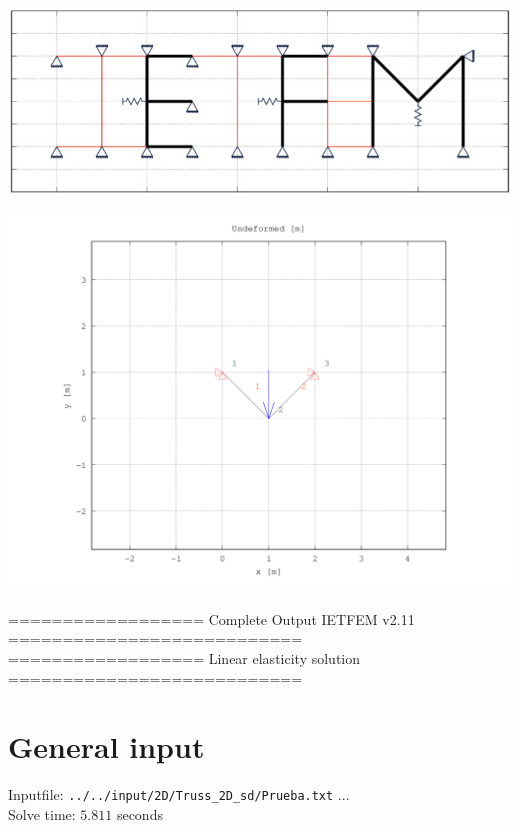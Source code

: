 \documentclass[a4paper,11pt]{article}
\begin{document}
\hspace{1.5cm}       
\begin{center}       
\includegraphics[width=.7\textwidth]{../../../../../../sources/Figs/logo_ietfem}      
\end{center}       
\begin{center}       
\includegraphics[width=.95\textwidth]{../../Prueba_undeformed.png}   
   \end{center}       

\newpage 

================== Complete Output IETFEM v2.11 ===========================\\
================== Linear elasticity solution ===========================
\tableofcontents     

\newpage     

\section{General input}

Inputfile: \verb|../../input/2D/Truss_2D_sd/Prueba.txt|  ... \\

Solve time: $ 5.811$ seconds \\
\end{document}
